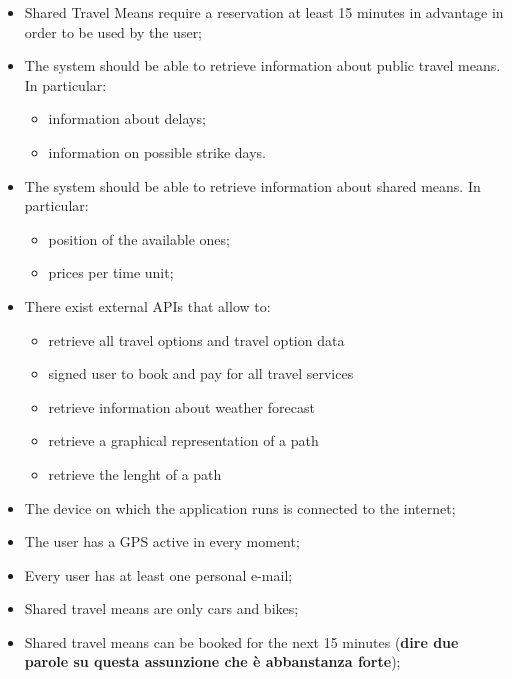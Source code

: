 \begin{itemize}

\item Shared Travel Means require a reservation at least 15 minutes in advantage in order to be used by the user;

\item The system should be able to retrieve information about public travel means. In particular:
\begin{itemize}
\item information about delays;
\item information on possible strike days.
\end{itemize}

\item The system should be able to retrieve information about shared means. In particular:
\begin{itemize}
\item position of the available ones;
\item prices per time unit;
\end{itemize}

\item There exist external APIs that allow to:
\begin{itemize}
\item retrieve all travel options and travel option data
\item signed user to book and pay for all travel services
\item retrieve information about weather forecast
\item retrieve a graphical representation of a path
\item retrieve the lenght of a path
\end{itemize}

\item The device on which the application runs is connected to the internet;

\item The user has a GPS active in every moment;

\item Every user has at least one personal e-mail;

\item Shared travel means are only cars and bikes;

\item Shared travel means can be booked for the next 15 minutes (\textbf{dire due parole su questa assunzione che è abbanstanza forte});

\end{itemize}




